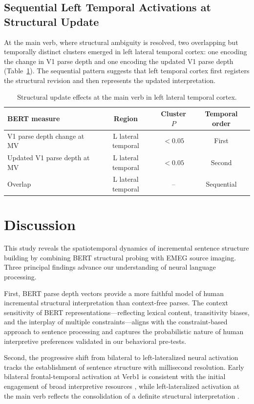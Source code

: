 \documentclass[11pt]{article}
\begin{document}
\subsection{Sequential Left Temporal Activations at Structural Update}

At the main verb, where structural ambiguity is resolved, two overlapping but temporally distinct clusters emerged in left lateral temporal cortex: one encoding the change in V1 parse depth and one encoding the updated V1 parse depth (Table~\ref{tab:update}). The sequential pattern suggests that left temporal cortex first registers the structural revision and then represents the updated interpretation.

\begin{table}[H]
\centering
\caption{Structural update effects at the main verb in left lateral temporal cortex.}
\label{tab:update}
\begin{tabular}{lccc}
\toprule
\textbf{BERT measure} & \textbf{Region} & \textbf{Cluster $P$} & \textbf{Temporal order} \\
\midrule
V1 parse depth change at MV & L lateral temporal & $<0.05$ & First \\
Updated V1 parse depth at MV & L lateral temporal & $<0.05$ & Second \\
Overlap & L lateral temporal & -- & Sequential \\
\bottomrule
\end{tabular}
\end{table}

\section{Discussion}

This study reveals the spatiotemporal dynamics of incremental sentence structure building by combining BERT structural probing with EMEG source imaging. Three principal findings advance our understanding of neural language processing.

First, BERT parse depth vectors provide a more faithful model of human incremental structural interpretation than context-free parses. The context sensitivity of BERT representations---reflecting lexical content, transitivity biases, and the interplay of multiple constraints---aligns with the constraint-based approach to sentence processing \citep{macdonald1994lexical} and captures the probabilistic nature of human interpretive preferences validated in our behavioral pre-tests.

Second, the progressive shift from bilateral to left-lateralized neural activation tracks the establishment of sentence structure with millisecond resolution. Early bilateral frontal-temporal activation at Verb1 is consistent with the initial engagement of broad interpretive resources \citep{hickok2007cortical, matchin2020functional}, while left-lateralized activation at the main verb reflects the consolidation of a definite structural interpretation \citep{friederici2012cortical}.
\end{document}
